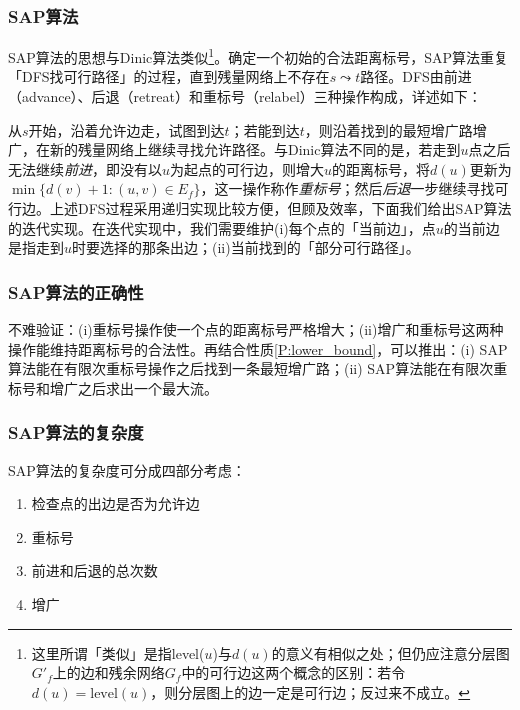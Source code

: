 \documentclass[a4paper]{ctexbook}
\begin{document}
  \subsubsection*{SAP算法}
  SAP算法的思想与Dinic算法类似\footnote{这里所谓「类似」是指level($u$)与$d(u)$的意义有相似之处；但仍应注意分层图$G'_f$上的边和残余网络$G_f$中的可行边这两个概念的区别：若令$d(u)=\mathrm{level}(u)$，则分层图上的边一定是可行边；反过来不成立。}。确定一个初始的合法距离标号，SAP算法重复「DFS找可行路径」的过程，直到残量网络上不存在$s\leadsto t$路径。DFS由前进（advance）、后退（retreat）和重标号（relabel）三种操作构成，详述如下：

  从$s$开始，沿着允许边走，试图到达$t$；若能到达$t$，则沿着找到的最短增广路增广，在新的残量网络上继续寻找允许路径。与Dinic算法不同的是，若走到$u$点之后无法继续\emph{前进}，即没有以$u$为起点的可行边，则增大$u$的距离标号，将$d(u)$更新为$\min\{d(v)+1\colon (u,v)\in E_f\}$，这一操作称作\emph{重标号}；然后\emph{后退}一步继续寻找可行边。上述DFS过程采用递归实现比较方便，但顾及效率，下面我们给出SAP算法的迭代实现。在迭代实现中，我们需要维护(i)每个点的「当前边」，点$u$的当前边是指走到$u$时要选择的那条出边；(ii)当前找到的「部分可行路径」。
  
  \subsubsection{SAP算法的正确性}
  不难验证：(i)重标号操作使一个点的距离标号严格增大；(ii)增广和重标号这两种操作能维持距离标号的合法性。再结合性质\ref{P:lower_bound}，可以推出：(i) SAP算法能在有限次重标号操作之后找到一条最短增广路；(ii) SAP算法能在有限次重标号和增广之后求出一个最大流。
  \subsubsection{SAP算法的复杂度}
  SAP算法的复杂度可分成四部分考虑：
  \begin{enumerate}
    \item 检查点的出边是否为允许边
    \item 重标号
    \item 前进和后退的总次数
    \item 增广
  \end{enumerate}
\end{document}
